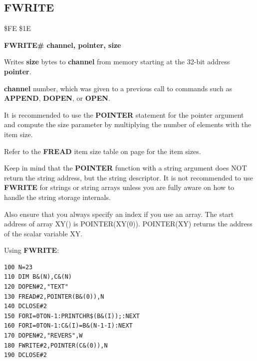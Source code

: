 
\newpage
\subsection{FWRITE}
\begin{description}[leftmargin=2cm,style=nextline]
\item [Token:] \$FE \$1E
\item [Format:] {\bf FWRITE\# channel, pointer, size}
\item [Usage:] Writes {\bf size} bytes to {\bf channel} from memory
               starting at the 32-bit address {\bf pointer}.

               {\bf channel} number, which was given to a previous
               call to commands such as {\bf APPEND}, {\bf DOPEN}, or {\bf OPEN}.

               It is recommended to use the {\bf POINTER} statement
               for the pointer argument and compute the size parameter
               by multiplying the number of elements with the item size.

               Refer to the {\bf FREAD} item size table on page \pageref{freadtable}
               for the item sizes.

Keep in mind that the {\bf POINTER} function with a string argument
does NOT return the string address, but the string descriptor.
It is not recommended to use {\bf FWRITE} for strings or string arrays
unless you are fully aware on how to handle the string storage internals.


Also ensure that you always specify an index if you use an array.
The start address of array XY() is POINTER(XY(0)).
POINTER(XY) returns the address of the scalar variable XY.


\item [Example:] Using {\bf FWRITE}:
\begin{tcolorbox}[colback=black,coltext=white]
\verbatimfont{\codefont}
\begin{verbatim}
100 N=23
110 DIM B&(N),C&(N)
120 DOPEN#2,"TEXT"
130 FREAD#2,POINTER(B&(0)),N
140 DCLOSE#2
150 FORI=0TON-1:PRINTCHR$(B&(I));:NEXT
160 FORI=0TON-1:C&(I)=B&(N-1-I):NEXT
170 DOPEN#2,"REVERS",W
180 FWRITE#2,POINTER(C&(0)),N
190 DCLOSE#2
\end{verbatim}
\end{tcolorbox}
\end{description}


